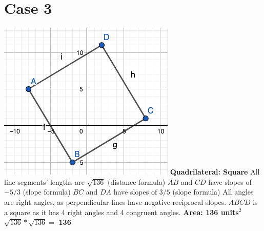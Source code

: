 \documentclass{article}
\begin{document}
	\section*{Case 3}
	\includegraphics[scale=0.46]{pics/Case3} \newline
	\textbf{Quadrilateral: Square} \newline
	All line segments' lengths are $\sqrt{136}$ (distance formula)\newline
	$AB$ and $CD$ have slopes of $-5/3$ (slope formula) \newline
	$BC$ and $DA$ have slopes of $3/5$ (slope formula) \newline
	All angles are right angles, as perpendicular lines have negative reciprocal slopes. \newline
	$ABCD$ is a square as it has 4 right angles and 4 congruent angles. \newline \newline
	\textbf{Area: 136 units$^2$} \newline
	$\sqrt{136} * \sqrt{136} = $ \textbf{136} 
	
\end{document}
